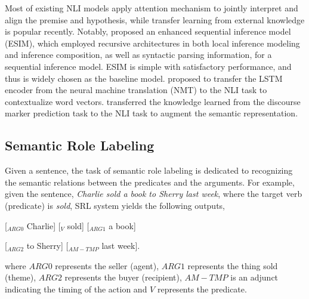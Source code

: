 \documentclass[11pt]{article}
\begin{document}
Most of existing NLI models apply attention  mechanism  to  jointly  interpret  and  align the premise and hypothesis,  while  transfer  learning  from
external knowledge is popular recently. Notably, \citet{Chen2017Enhanced}  proposed  an  enhanced  sequential  inference model (ESIM), which employed recursive architectures in both local inference modeling and
inference composition, as well as syntactic
parsing information, for a sequential inference model. ESIM is simple with satisfactory performance, and thus is widely chosen as the baseline model. \citet{Mccann2017Learned} proposed  to
transfer  the  LSTM  encoder  from  the  neural
machine translation (NMT) to the NLI task to contextualize word vectors. \citet{pan2018discourse} transferred the  knowledge learned from the discourse marker prediction task
to the NLI task to augment the semantic representation.

\subsection{Semantic Role Labeling}
Given a sentence, the task of semantic role labeling is dedicated to recognizing the semantic relations between the predicates
and the arguments. For example, given the sentence, \emph{Charlie sold a book to Sherry last week}, where the target verb (predicate) is \emph{sold}, SRL system yields the following outputs,
\begin{spacing}{1.3}
\end{spacing}
[$_{ARG0}$ Charlie] [$_{V}$ sold] [$_{ARG1}$ a book] 

[$_{ARG2}$ to Sherry] [$_{AM-TMP}$ last week].
\begin{spacing}{1.3}
\end{spacing}
\noindent where $ARG0$ represents the  seller (agent), $ARG1$ represents the thing sold (theme), $ARG2$ represents the buyer (recipient), $AM-TMP$ is an adjunct indicating the timing of the action and $V$ represents the predicate.
\end{document}
